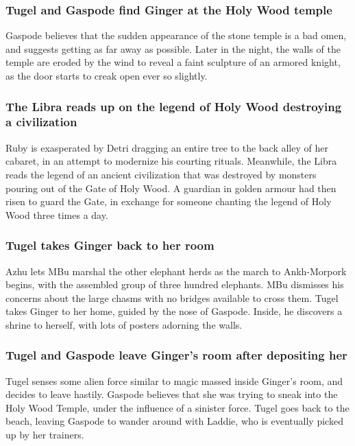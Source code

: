 \subsubsection{\Gls{Tugel} and \Gls{Gaspode} find \Gls{Ginger} at the Holy Wood temple}
\Gls{Gaspode} believes that the sudden appearance of the stone temple is a bad omen, and suggests
getting as far away as possible. Later in the night, the walls of the temple are eroded by the wind
to reveal a faint sculpture of an armored knight, as the door starts to creak open ever so slightly.

\subsubsection{The \Gls{Libra} reads up on the legend of Holy Wood destroying a civilization}
\Gls{Ruby} is exasperated by \Gls{Detri} dragging an entire tree to the back alley of her cabaret,
in an attempt to modernize his courting rituals. Meanwhile, the \Gls{Libra} reads the legend of an
ancient civilization that was destroyed by monsters pouring out of the Gate of Holy Wood. A
guardian in golden armour had then risen to guard the Gate, in exchange for someone chanting the
legend of Holy Wood three times a day.

\subsubsection{\Gls{Tugel} takes \Gls{Ginger} back to her room}
\Gls{Azhu} lets \Gls{MBu} marshal the other elephant herds as the march to Ankh-Morpork begins, with
the assembled group of three hundred elephants. \Gls{MBu} dismisses his concerns about the large
chasms with no bridges available to cross them. \Gls{Tugel} takes \Gls{Ginger} to her home, guided
by the nose of \Gls{Gaspode}. Inside, he discovers a shrine to herself, with lots of posters
adorning the walls.

\subsubsection{\Gls{Tugel} and \Gls{Gaspode} leave \Gls{Ginger}'s room after depositing her}
\Gls{Tugel} senses some alien force similar to magic massed inside \Gls{Ginger}'s room, and decides
to leave hastily. \Gls{Gaspode} believes that she was trying to sneak into the Holy Wood Temple,
under the influence of a sinister force. \Gls{Tugel} goes back to the beach, leaving \Gls{Gaspode}
to wander around with \Gls{Laddie}, who is eventually picked up by her trainers.

